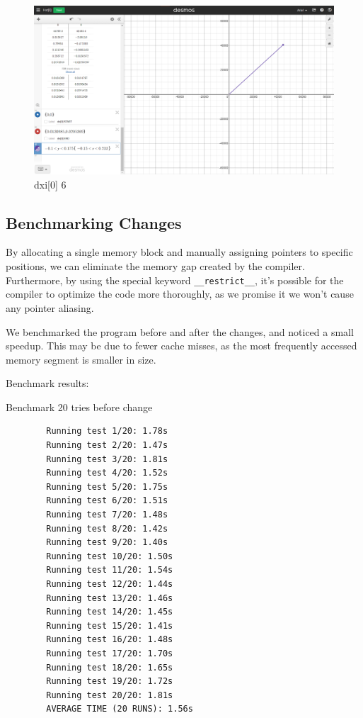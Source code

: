\begin{figure}[H]
    \includegraphics[width=\columnwidth]{figs/dxi[0]_6}
    \caption{dxi[0] 6}
\end{figure}


\subsection{Benchmarking Changes}
By allocating a single memory block and manually assigning pointers to specific
positions, we can eliminate the memory gap created by the compiler. Furthermore,
by using the special keyword \verb|__restrict__|, it's possible for the compiler
to optimize the code more thoroughly, as we promise it we won't cause any
pointer aliasing.

We benchmarked the program before and after the changes, and noticed a small
speedup. This may be due to fewer cache misses, as the most frequently accessed
memory segment is smaller in size.

Benchmark results:

Benchmark 20 tries before change
\footnotesize\begin{verbatim}
        Running test 1/20: 1.78s
        Running test 2/20: 1.47s
        Running test 3/20: 1.81s
        Running test 4/20: 1.52s
        Running test 5/20: 1.75s
        Running test 6/20: 1.51s
        Running test 7/20: 1.48s
        Running test 8/20: 1.42s
        Running test 9/20: 1.40s
        Running test 10/20: 1.50s
        Running test 11/20: 1.54s
        Running test 12/20: 1.44s
        Running test 13/20: 1.46s
        Running test 14/20: 1.45s
        Running test 15/20: 1.41s
        Running test 16/20: 1.48s
        Running test 17/20: 1.70s
        Running test 18/20: 1.65s
        Running test 19/20: 1.72s
        Running test 20/20: 1.81s
        AVERAGE TIME (20 RUNS): 1.56s
\end{verbatim}
\normalsize

